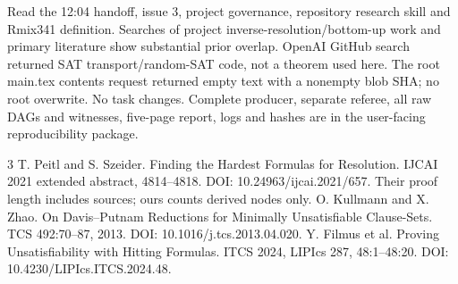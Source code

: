 \documentclass[11pt]{article}
\begin{document}
Read the 12:04 handoff, issue 3, project governance, repository research skill and Rmix341 definition. Searches of project inverse-resolution/bottom-up work and primary literature show substantial prior overlap. OpenAI GitHub search returned SAT transport/random-SAT code, not a theorem used here. The root main.tex contents request returned empty text with a nonempty blob SHA; no root overwrite. No task changes. Complete producer, separate referee, all raw DAGs and witnesses, five-page report, logs and hashes are in the user-facing reproducibility package.

\begin{thebibliography}{3}
 T. Peitl and S. Szeider. Finding the Hardest Formulas for Resolution. IJCAI 2021 extended abstract, 4814--4818. DOI: 10.24963/ijcai.2021/657. Their proof length includes sources; ours counts derived nodes only.
 O. Kullmann and X. Zhao. On Davis--Putnam Reductions for Minimally Unsatisfiable Clause-Sets. TCS 492:70--87, 2013. DOI: 10.1016/j.tcs.2013.04.020.
 Y. Filmus et al. Proving Unsatisfiability with Hitting Formulas. ITCS 2024, LIPIcs 287, 48:1--48:20. DOI: 10.4230/LIPIcs.ITCS.2024.48.
\end{thebibliography}
\end{document}
